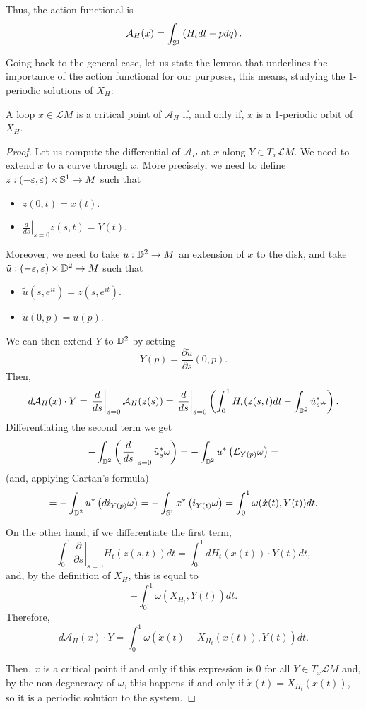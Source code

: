 Thus, the action functional is
$$\mathcal{A}_H (x) = \int_{\mathbb{S}^1} \left( H_t d t - p d q \right) .$$

Going back to the general case, let us state the lemma that underlines the importance of the action functional for our purposes, this means, studying the 1-periodic solutions of $X_H$:

\begin{prop}
A loop $x \in \mathcal{L}M$ is a critical point of $\mathcal{A}_H$ if, and only if, $x$ is a 1-periodic orbit of $X_H$.
\end{prop}

\begin{proof}
Let us compute the differential of $\mathcal{A}_H$ at $x$ along $Y \in T_x\mathcal{L}M$. We need to extend $x$ to a curve through $x$. More precisely, we need to define $z : (-\varepsilon,\varepsilon) \times \mathbb{S}^1 \rightarrow M$ such that

\begin{itemize}
	\item $z(0,t) = x(t)$.
	\item $\left. \frac{d}{d s} \right|_{s=0} z(s,t) = Y(t)$.
\end{itemize}

Moreover, we need to take $u : \mathbb{D}^2 \rightarrow M$ an extension of $x$ to the disk, and take $\tilde{u} : (-\varepsilon,\varepsilon) \times \mathbb{D}^2 \rightarrow M$ such that

\begin{itemize}
	\item $\tilde{u}(s,e^{it}) = z(s,e^{it})$.
	\item $\tilde{u}(0,p) = u(p)$.
\end{itemize}

We can then extend $Y$ to $\mathbb{D}^2$ by setting
$$Y(p) = \frac{\partial \tilde{u}}{\partial s} (0,p) .$$
Then,
$$d \mathcal{A}_H(x) \cdot Y = \left. \frac{d}{d s} \right|_{s=0} \mathcal{A}_H(z(s)) = \left. \frac{d}{d s} \right|_{s=0} \left( \int_0^1 H_t(z(s,t) d t - \int_{\mathbb{D}^2} \tilde{u}_s^{\ast} \omega \right) .$$
Differentiating the second term we get
$$- \int_{\mathbb{D}^2} \left( \left. \frac{d}{d s} \right|_{s=0} \tilde{u}_s^{\ast} \omega \right) = - \int_{\mathbb{D}^2} u^{\ast} \left( \mathcal{L}_{Y(p)} \omega \right) =$$
(and, applying Cartan's formula)
$$= - \int_{\mathbb{D}^2} u^{\ast} \left( d i_{Y(p)} \omega \right) = - \int_{\mathbb{S}^1} x^{\ast} \left( i_{Y(t)} \omega \right) = \int_0^1 \omega(\dot{x}(t),Y(t)) d t .$$

On the other hand, if we differentiate the first term,
$$\int_0^1 \left. \frac{\partial}{\partial s} \right|_{s=0} H_t(z(s,t)) d t = \int_0^1 d H_t(x(t)) \cdot Y(t) d t ,$$
and, by the definition of $X_H$, this is equal to
$$- \int_0^1 \omega(X_{H_t},Y(t)) d t .$$
Therefore,
$$d \mathcal{A}_H(x) \cdot Y = \int_0^1 \omega(\dot{x}(t) - X_{H_t}(x(t)), Y(t)) d t .$$

Then, $x$ is a critical point if and only if this expression is $0$ for all $Y \in T_x\mathcal{L}M$ and, by the non-degeneracy of $\omega$, this happens if and only if $\dot{x}(t) = X_{H_t}(x(t))$, so it is a periodic solution to the system.
\end{proof}
